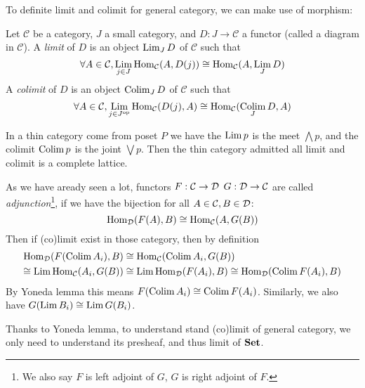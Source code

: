 To definite limit and colimit for general category, we can make use of morphism:
\begin{definition}
  Let $\mathcal{C}$ be a category, $J$ a small category, and $D : J \to \mathcal{C}$ a functor (called a diagram in $\mathcal{C}$). A \emph{limit} of $D$ is an object $\operatorname*{\mathrm{Lim}}_J D$ of $\mathcal{C}$ such that 
\[
  \forall A\in \mathcal{C}, \operatorname*{\mathrm{Lim}}_{j\in J} \mathrm{Hom}_{\mathcal{C}}(A, D(j) ) \cong \mathrm{Hom}_{\mathcal{C}}(A, \operatorname*{\mathrm{Lim}}_{J} D)
\]
A \emph{colimit} of $D$ is an object $\operatorname*{\mathrm{Colim}}_J D$ of $\mathcal{C}$ such that
\[
  \forall A\in \mathcal{C}, \operatorname*{\mathrm{Lim}}_{j\in J^{\mathrm{op}}} \mathrm{Hom}_{\mathcal{C}}(D(j) , A) \cong \mathrm{Hom}_{\mathcal{C}}(\operatorname*{\mathrm{Colim}}_{ J} D, A)
\]
\end{definition}
\begin{example}
 In a thin category come from poset $P$ we have the $\operatorname*{\mathrm{Lim}} p $ is the meet $\bigwedge p$, and the colimit $\operatorname*{\mathrm{Colim}} p$ is the joint $ \bigvee p$. Then the thin category admitted all limit and colimit is a complete lattice.
\end{example}
\begin{remark}
  As we have aready seen a lot, functors $F:\mathcal{C} \to \mathcal{D}$ $G:\mathcal{D} \to \mathcal{C}$ are called \emph{adjunction}\footnote{We also say $F$ is left adjoint of $G$, $G$ is right adjoint of $F$.}, if we have the bijection for all $A\in \mathcal{C}, B \in \mathcal{D}$:
  \[
    \mathrm{Hom}_{\mathcal{D}}(F(A),B)\cong \mathrm{Hom}_{\mathcal{C}}(A,G(B))
  \]
  Then if (co)limit exist in those category, then by definition
  \begin{align*}
     \mathrm{Hom}_{\mathcal{D}}(F(\operatorname*{\mathrm{Colim}} A_i),B) &\cong \mathrm{Hom}_{\mathcal{C}}(\operatorname*{\mathrm{Colim}} A_i,G(B))\\
    \cong \operatorname*{\mathrm{Lim}} \mathrm{Hom}_{\mathcal{C}}( A_i,G(B)) & \cong  \operatorname*{\mathrm{Lim}} \mathrm{Hom}_{\mathcal{D}}( F(A_i),B)\cong   \mathrm{Hom}_{\mathcal{D}}(\operatorname*{\mathrm{Colim}} F(A_i),B)
  \end{align*}
  By Yoneda lemma this means $F(\operatorname*{\mathrm{Colim}} A_i)\cong \operatorname*{\mathrm{Colim}} F(A_i)$. Similarly, we also have $G(\operatorname*{\mathrm{Lim}} B_i) \cong \operatorname*{\mathrm{Lim}} G( B_i)$.
\end{remark}

Thanks to Yoneda lemma, to understand stand (co)limit of general category, we only need to understand its presheaf, and thus limit of $\mathbf{Set}$.


